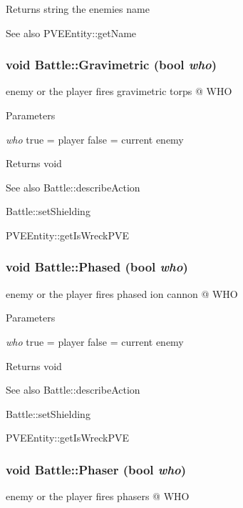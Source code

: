\begin{DoxyReturn}{Returns}
string the enemies name
\end{DoxyReturn}
\begin{DoxySeeAlso}{See also}
PVEEntity::getName 
\end{DoxySeeAlso}
\hypertarget{classBattle_a59fbad01d3da6683a902601dee2a244c}{
\subsubsection[{Gravimetric}]{\setlength{\rightskip}{0pt plus 5cm}void Battle::Gravimetric (bool {\em who})}}
\label{dd/dfd/classBattle_a59fbad01d3da6683a902601dee2a244c}
enemy or the player fires gravimetric torps @ WHO


\begin{DoxyParams}{Parameters}
\item[{\em who}]true = player false = current enemy\end{DoxyParams}
\begin{DoxyReturn}{Returns}
void
\end{DoxyReturn}
\begin{DoxySeeAlso}{See also}
Battle::describeAction 

Battle::setShielding

PVEEntity::getIsWreckPVE 
\end{DoxySeeAlso}
\hypertarget{classBattle_af93833dc6f45a9a9b57b3fd0a98c7b53}{
\subsubsection[{Phased}]{\setlength{\rightskip}{0pt plus 5cm}void Battle::Phased (bool {\em who})}}
\label{dd/dfd/classBattle_af93833dc6f45a9a9b57b3fd0a98c7b53}
enemy or the player fires phased ion cannon @ WHO


\begin{DoxyParams}{Parameters}
\item[{\em who}]true = player false = current enemy\end{DoxyParams}
\begin{DoxyReturn}{Returns}
void
\end{DoxyReturn}
\begin{DoxySeeAlso}{See also}
Battle::describeAction 

Battle::setShielding

PVEEntity::getIsWreckPVE 
\end{DoxySeeAlso}
\hypertarget{classBattle_ac47c4c6769ba4c285b6b3bce196665f7}{
\subsubsection[{Phaser}]{\setlength{\rightskip}{0pt plus 5cm}void Battle::Phaser (bool {\em who})}}
\label{dd/dfd/classBattle_ac47c4c6769ba4c285b6b3bce196665f7}
enemy or the player fires phasers @ WHO


